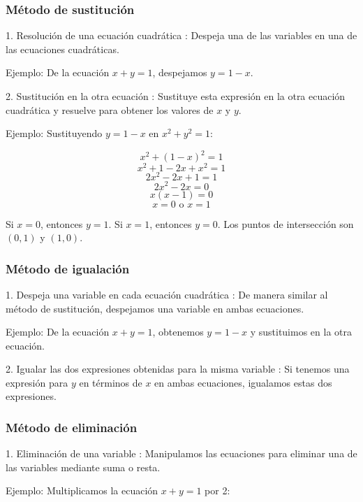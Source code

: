     \subsubsection{Método de sustitución}
    
    1.  Resolución de una ecuación cuadrática : Despeja una de las variables en una de las ecuaciones cuadráticas. 
       
       Ejemplo: De la ecuación \(x + y = 1\), despejamos \(y = 1 - x\).
    
    2.  Sustitución en la otra ecuación : Sustituye esta expresión en la otra ecuación cuadrática y resuelve para obtener los valores de \(x\) y \(y\).
       
       Ejemplo: Sustituyendo \(y = 1 - x\) en \(x^2 + y^2 = 1\):
    
       \[
       x^2 + (1 - x)^2 = 1
       \]
       \[
       x^2 + 1 - 2x + x^2 = 1
       \]
       \[
       2x^2 - 2x + 1 = 1
       \]
       \[
       2x^2 - 2x = 0
       \]
       \[
       x(x - 1) = 0
       \]
       \[
       x = 0 \text{ o } x = 1
       \]
    
       Si \(x = 0\), entonces \(y = 1\). Si \(x = 1\), entonces \(y = 0\). Los puntos de intersección son \((0, 1)\) y \((1, 0)\).
    
    \subsubsection{Método de igualación}
    
    1.  Despeja una variable en cada ecuación cuadrática : De manera similar al método de sustitución, despejamos una variable en ambas ecuaciones.
       
       Ejemplo: De la ecuación \(x + y = 1\), obtenemos \(y = 1 - x\) y sustituimos en la otra ecuación.
    
    2.  Igualar las dos expresiones obtenidas para la misma variable : Si tenemos una expresión para \(y\) en términos de \(x\) en ambas ecuaciones, igualamos estas dos expresiones.
    
    \subsubsection{Método de eliminación}
    
    1.  Eliminación de una variable : Manipulamos las ecuaciones para eliminar una de las variables mediante suma o resta.
    
       Ejemplo: Multiplicamos la ecuación \(x + y = 1\) por 2:
    
